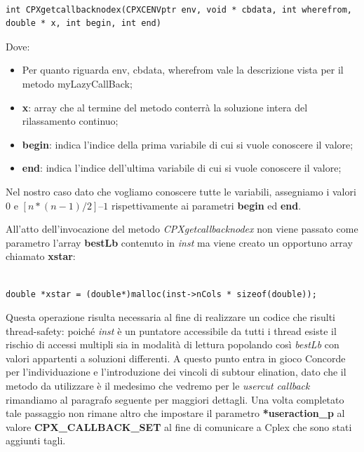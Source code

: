 \documentclass[11pt]{article}
\begin{document}
\begin{lstlisting}

int CPXgetcallbacknodex(CPXCENVptr env, void * cbdata, int wherefrom, double * x, int begin, int end) 

\end{lstlisting}

Dove:

\begin{itemize}
    \item Per quanto riguarda env, cbdata, wherefrom vale la descrizione vista per il metodo myLazyCallBack;
    \item \textbf{x}: array che al termine del metodo conterrà la soluzione intera del rilassamento continuo;
    \item \textbf{begin}: indica l’indice della prima variabile di cui si vuole conoscere il valore;
    \item \textbf{end}: indica l’indice dell’ultima variabile di cui si vuole conoscere il valore;
\end{itemize}

Nel nostro caso dato che vogliamo conoscere tutte le variabili, assegniamo i valori \textbf{$0$} e \textbf{$[n*(n-1)/2] – 1$} rispettivamente ai parametri \textbf{begin} ed \textbf{end}.

All'atto dell'invocazione del metodo \textit{CPXgetcallbacknodex} non viene passato come parametro l'array \textbf{bestLb} contenuto in \textit{inst} ma viene creato un opportuno array chiamato \textbf{xstar}:

\begin{lstlisting}

double *xstar = (double*)malloc(inst->nCols * sizeof(double));

\end{lstlisting}

Questa operazione risulta necessaria al fine di realizzare un codice che risulti thread-safety: poiché \textit{inst} è un puntatore accessibile da tutti i thread esiste il rischio di accessi multipli sia in modalità di lettura popolando così \textit{bestLb} con valori appartenti a soluzioni differenti.
A questo punto entra in gioco Concorde per l'individuazione e l'introduzione dei vincoli di subtour elination, dato che il metodo da utilizzare è il medesimo che vedremo per le \textit{usercut callback} rimandiamo al paragrafo seguente per maggiori dettagli.
Una volta completato tale passaggio non rimane altro che impostare il parametro \textbf{*useraction\_p} al valore \textbf{CPX\_CALLBACK\_SET} al fine di comunicare a Cplex che sono stati aggiunti tagli.
\end{document}
